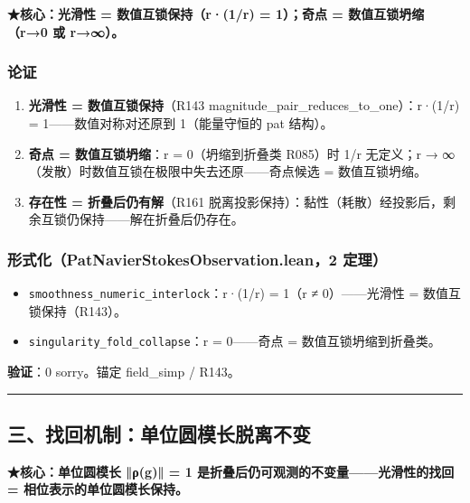 \documentclass[
]{article}
\providecommand{\tightlist}{%
 \setlength{\itemsep}{0pt}\setlength{\parskip}{0pt}}
\begin{document}
\textbf{★核心：光滑性 = 数值互锁保持（r·(1/r) = 1）；奇点 =
数值互锁坍缩（r→0 或 r→∞）。}

\subsubsection{论证}\label{ux8bbaux8bc1-1}

\begin{enumerate}
\def\labelenumi{\arabic{enumi}.}
\tightlist
\item
 \textbf{光滑性 = 数值互锁保持}（R143
 magnitude\_pair\_reduces\_to\_one）：r·(1/r) = 1------数值对称对还原到
 1（能量守恒的 pat 结构）。
\item
 \textbf{奇点 = 数值互锁坍缩}：r = 0（坍缩到折叠类 R085）时 1/r
 无定义；r → ∞（发散）时数值互锁在极限中失去还原------奇点候选 =
 数值互锁坍缩。
\item
 \textbf{存在性 = 折叠后仍有解}（R161
 脱离投影保持）：黏性（耗散）经投影后，剩余互锁仍保持------解在折叠后仍存在。
\end{enumerate}

\subsubsection{形式化（PatNavierStokesObservation.lean，2
定理）}\label{ux5f62ux5f0fux5316patnavierstokesobservation.lean2-ux5b9aux7406}

\begin{itemize}
\tightlist
\item
 \texttt{smoothness\_numeric\_interlock}：r·(1/r) = 1（r ≠
 0）------光滑性 = 数值互锁保持（R143）。
\item
 \texttt{singularity\_fold\_collapse}：r = 0------奇点 =
 数值互锁坍缩到折叠类。
\end{itemize}

\textbf{验证}：0 sorry。锚定 field\_simp / R143。

\begin{center}\rule{0.5\linewidth}{0.5pt}\end{center}

\subsection{三、找回机制：单位圆模长脱离不变}\label{ux4e09ux627eux56deux673aux5236ux5355ux4f4dux5706ux6a21ux957fux8131ux79bbux4e0dux53d8}

\textbf{★核心：单位圆模长 ‖ρ(g)‖ = 1
是折叠后仍可观测的不变量------光滑性的找回 = 相位表示的单位圆模长保持。}
\end{document}

